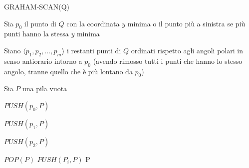 \documentclass[12pt,a4paper]{report}
\begin{document}
\begin{algorithm}[ht]
\caption{GRAHAM-SCAN(Q)}\label{alg:graham}

\vspace{0.3cm}

\nl Sia $p_0$ il punto di $Q$ con la coordinata $y$ minima o il punto più a sinistra se più punti hanno la stessa $y$ minima

\vspace{0.3cm}

\nl Siano $\langle p_1, p_2, ..., p_m \rangle$ i restanti punti di $Q$ ordinati rispetto agli angoli polari in senso antiorario intorno a $p_0$ (avendo rimosso tutti i punti che hanno lo stesso angolo, tranne quello che è più lontano da $p_0$)

\vspace{0.3cm}

\nl Sia $P$ una pila vuota

\vspace{0.3cm}

\nl $PUSH(p_0, P)$

\vspace{0.1cm}

\nl $PUSH(p_1, P)$

\vspace{0.1cm}

\nl $PUSH(p_2, P)$

\vspace{0.3cm}

\nl {} {
\vspace{0.1cm}
\nl {} {
\vspace{0.1cm}
\nl $POP(P)$
}
\vspace{0.1cm}
\nl $PUSH(P_i,P)$
}
\vspace{0.3cm}
\nl \Return P
\end{algorithm}
\end{document}
